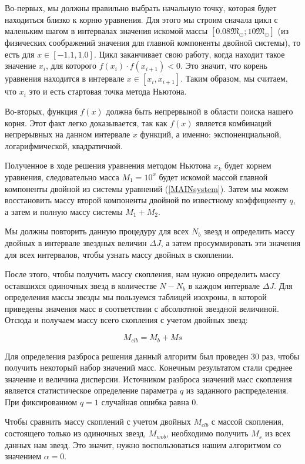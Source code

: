 \documentclass[a4paper,12pt]{article}
\begin{document}
Во-первых, мы должны правильно выбрать начальную точку, которая будет находиться близко к корню уравнения. Для этого мы строим сначала цикл с маленьким шагом в интервалах значения искомой массы $[0.08 \mathfrak{M}_{\odot};10 \mathfrak{M}_{\odot}]$ (из физических соображений значения для главной компоненты двойной системы), то есть для $x \in [-1.1,1.0]$. Цикл заканчивает свою работу, когда находит такое значение $x_i$, для которого $f(x_i)\cdot f(x_{i+1}) <0$. Это значит, что корень уравнения находится в интервале $x \in [x_i,x_{i+1}]$. Таким образом, мы считаем, что $x_i$ это и есть стартовая точка метода Ньютона.

Во-вторых, функция $f(x)$ должна быть непрервыной в области поиска нашего корня. Этот факт легко доказывается, так как $f(x)$ является комбинаций непрерывных на данном интервале $x$ функций, а именно: экспоненциальной, логарифмической, квадратичной.

Полученное в ходе решения уравнения методом Ньютона $x_k$ будет корнем уравнения, следовательно масса $M_1=10^x$ будет искомой массой главной компоненты двойной из системы уравнений (\ref{MAINsystem}).
Затем мы можем восстановить массу второй компоненты двойной по известному коэффициенту $q$, а затем и полную массу системы $M_1+M_2$.

Мы должны повторить данную процедуру для всех $N_{b}$  звезд и определить массу двойных в интервале звездных величин $\Delta J$, а затем просуммировать эти значения для всех интервалов, чтобы узнать массу двойных в скоплении.

После этого, чтобы получить массу скопления, нам нужно определить массу оставшихся одиночных звезд в количестве $N-N_{b}$ в каждом интервале $\Delta J$. Для определения массы звезды мы пользуемся таблицей изохроны, в которой приведены значения масс в соответствии с абсолютной звездной величиной. Отсюда и получаем массу всего скопления с учетом двойных звезд:

\begin{equation}
M_{clb} = M_{b}+M{s}
\end{equation}

Для определения разброса решения данный алгоритм был проведен 30 раз, чтобы получить некоторый набор значений масс. Конечным результатом стали среднее значение и величина дисперсии. Источником разброса значений масс скопления является статистическое определение параметра $q$ из заданного распределения. При фиксированном $q=1$ случайная ошибка равна 0.

Чтобы сравнить массу скоплений с учетом двойных $M_{clb}$ с массой скопления, состоящего только из одиночных звезд, $M_{wob}$, необходимо получить $M_{s}$ из всех данных нам звезд. Это значит, нужно воспользоваться нашим алгоритмом со значением $\alpha = 0$.

	\newpage
	
\end{document}
